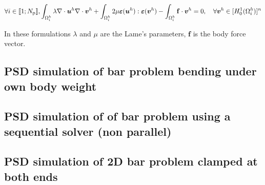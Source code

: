 \begin{equation}\label{Eq:LinearElasticity}
\forall i \in \llbracket 1; N_{\text p} \rrbracket, 
\int_{\Omega^h_i}\lambda\nabla\cdot\boldsymbol u^h\nabla\cdot\boldsymbol v^h + \int_{\Omega^h_i}2\mu\boldsymbol\varepsilon(\boldsymbol u^h):\boldsymbol\varepsilon(\boldsymbol v^h)-\int_{\Omega^h_i}\mathbf{f}\cdot\boldsymbol v^h=0, \quad\forall\boldsymbol v^h\in[H^1_0(\Omega^h_i)]^n 
\end{equation}

In these formulations $\lambda$ and $\mu$ are the Lame's parameters, $\mathbf{f}$ is the body force vector.  

\subsection{PSD simulation of bar problem bending under own body weight \label{sec:2d-bar-load}}

{
	\renewcommand{\subsection}{\subsubsection}
	
}

\subsection{PSD simulation of of bar problem using a sequential solver (non parallel) \label{sec:2d-seq-load}}

{
	\renewcommand{\subsection}{\subsubsection}
	
}



\subsection{PSD simulation of 2D bar problem clamped at both ends \label{sec:2D-bar-clamped1}}

{
	\renewcommand{\subsection}{\subsubsection}
	
}


